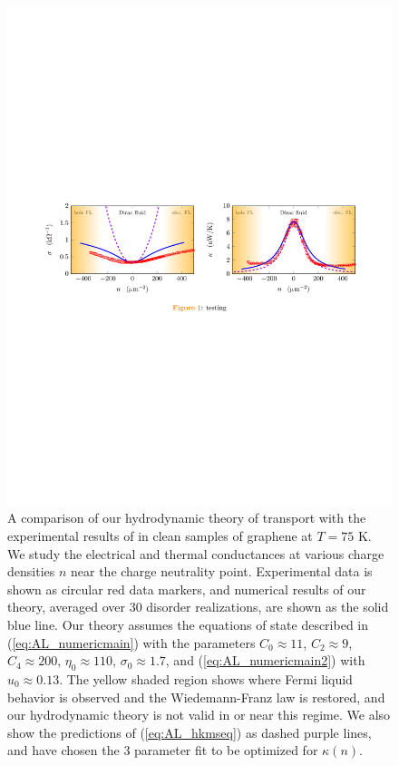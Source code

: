 \begin{figure}
\centering
\includegraphics[width=\textwidth]{figures/hydro_theory/mainfigplot.pdf}
\caption{A comparison of our hydrodynamic theory of transport with the experimental results of \cite{crossno_observation_2016} in clean samples of graphene at $T=75$ K.   We study the electrical and thermal conductances at various charge densities $n$ near the charge neutrality point.  Experimental data is shown as circular red data markers, and numerical results of our theory, averaged over 30 disorder realizations, are shown as the solid blue line.   Our theory assumes the equations of state described in (\ref{eq:AL_numericmain}) with the parameters $C_0\approx 11$, $C_2\approx 9$,  $C_4\approx 200$,  $\eta_0\approx 110$, $\sigma_0\approx 1.7$,  and (\ref{eq:AL_numericmain2}) with $u_0 \approx 0.13$.   The yellow shaded region shows where Fermi liquid behavior is observed and the Wiedemann-Franz law is restored, and our hydrodynamic theory is not valid in or near this regime.   We also show the predictions of (\ref{eq:AL_hkmseq}) as dashed purple lines, and have chosen the 3 parameter fit to be optimized for $\kappa(n)$. }
\label{fig:AL_mainfig}
\end{figure}


